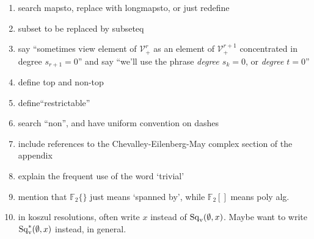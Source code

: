 \documentclass[11pt]{amsart}
\theoremstyle{plain}
\theoremstyle{definition}
\newcommand{\calV}{\mathcal{V}}
\theoremstyle{plain}
\newcommand{\vect}[2]{\calV^{#1}_{#2}}
\newcommand{\Sqv}{\mathrm{Sq}_\textup{v}}
\newcommand{\F}{\mathbb{F}}
\begin{document}
\begin{todolist}
\begin{enumerate}
\item search mapsto, replace with longmapsto, or just redefine
\item subset to be replaced by subseteq
\item say ``sometimes view element of $\vect{r}{+}$ as an element of $\vect{r+1}{+}$ concentrated in degree $s_{r+1}=0$'' and say ``we'll use the phrase \emph{degree $s_k=0$}, or \emph{degree $t=0$}''
\item define top and non-top
\item define``restrictable''
\item search ``non'', and have uniform convention on dashes
\item include references to the Chevalley-Eilenberg-May complex section of the appendix
\item explain the frequent use of the word `trivial'
\item mention that $\F_2\{\}$ just means `spanned by', while $\F_2[]$ means poly alg.
\item in koszul resolutions, often write $x$ instead of $\Sqv(\emptyset,x)$. Maybe want to write $\Sqv^*(\emptyset,x)$ instead, in general.
\end{enumerate}
\end{todolist}
\end{document}

